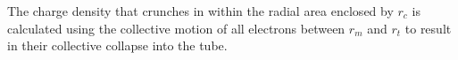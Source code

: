 \documentclass[aps,twocolumn,notitlepage,superscriptaddress]{revtex4-1}
\begin{document}
The charge density that crunches in within the radial area enclosed by $r_{c}$ is calculated using the collective motion of all electrons between $r_m$ and $r_t$ to result in their collective collapse into the tube. 

%
%
\end{document}
